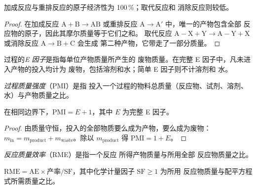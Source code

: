 \begin{proposition}[按反应类型划分的原子经济性]\label{prop:b3:green-industrial:ae-classes}
加成反应与重排反应的原子经济性为 100\,\%；取代反应和
消除反应则较低。
\end{proposition}

\begin{proof}
在加成反应 $\mathrm{A} + \mathrm{B} \to \mathrm{AB}$ 或重排反应 $\mathrm{A} \to \mathrm{A'}$ 中，唯一的产物包含全部
反应物的原子，因此其摩尔质量等于它们之和。
取代反应 $\mathrm{A{-}X} + \mathrm{Y} \to \mathrm{A{-}Y} + \mathrm{X}$ 或消除反应 $\mathrm{A} \to \mathrm{B} + \mathrm{C}$ 会生成
第二种产物，它带走了一部分质量。
\end{proof}

\begin{definition}[E 因子]\label{def:b3:green-industrial:e-factor}
过程的\emph{E 因子}是指每单位产物质量所产生的
废物质量。在完整 E 因子中，凡未进入产物的投入均计为
废物，包括溶剂和水；简单 E 因子则不计溶剂和
水。
\end{definition}

\begin{definition}[过程质量强度]\label{def:b3:green-industrial:pmi}
\emph{过程质量强度}（PMI）是指
投入一个过程的物料总质量（反应物、试剂、溶剂、
水）与产物质量之比。
\end{definition}

\begin{proposition}[PMI 与 E 因子]\label{prop:b3:green-industrial:pmi-e}
在相同边界下，$\mathrm{PMI} = E + 1$，其中 $E$ 为完整 E 因子。
\end{proposition}

\begin{proof}
由质量守恒，投入的全部物质要么成为产物，要么成为废物：
$m_{\mathrm{in}} = m_{\mathrm{product}} + m_{\mathrm{waste}}$。除以 $m_{\mathrm{product}}$ 得 $\mathrm{PMI} = 1 + E$。
\end{proof}

\begin{definition}[反应质量效率]\label{def:b3:green-industrial:rme}
\emph{反应质量效率}（RME）是指一个反应
所得产物质量与所用全部
反应物质量之比。
\end{definition}

\begin{proposition}\label{prop:b3:green-industrial:rme}
$\mathrm{RME} = \mathrm{AE} \times \text{产率}/\mathrm{SF}$，其中化学计量因子 $\mathrm{SF} \ge 1$ 为所用
反应物质量与配平方程式所需质量之比。
\end{proposition}

